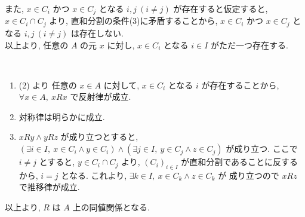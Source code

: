 \begin{nmprob}
{また, $x \in C_i$ かつ $x \in C_j$ となる $i, j\ (i \neq j)$ が存在すると仮定すると, $x \in C_i \cap C_j$ より, 直和分割の条件(3)に矛盾することから, 
$x \in C_i$ かつ $x \in C_j$ となる $i, j\ (i \neq j)$ は存在しない.\\
以上より, 任意の $A$ の元 $x$ に対し, $x \in C_i$ となる $i \in I$ がただ一つ存在する.
\item \
\begin{enumerate}
    \item (2) より 任意の $x \in A$ に対して, $x \in C_i$ となる $i$ が存在することから, $\forall x \in A,\ xRx$ で反射律が成立.
    \item 対称律は明らかに成立.
    \item $xRy \land yRz$ が成り立つとすると, $(\exists i \in I,\ x \in C_i \land y \in C_i) \land (\exists j \in I,\ y \in C_j \land z \in C_j)$ が成り立つ.
    ここで $i \neq j$ とすると, $y \in C_i \cap C_j$ より, $(C_i)_{i\in I}$ が直和分割であることに反するから, $i = j$ となる. これより, $\exists k \in I,\ x \in C_k \land z \in C_k$ が
    成り立つので $xRz$ で推移律が成立.
\end{enumerate}
以上より, $R$ は $A$ 上の同値関係となる.
}
\makeatletter\tagsleft@false\makeatother
\end{nmprob}